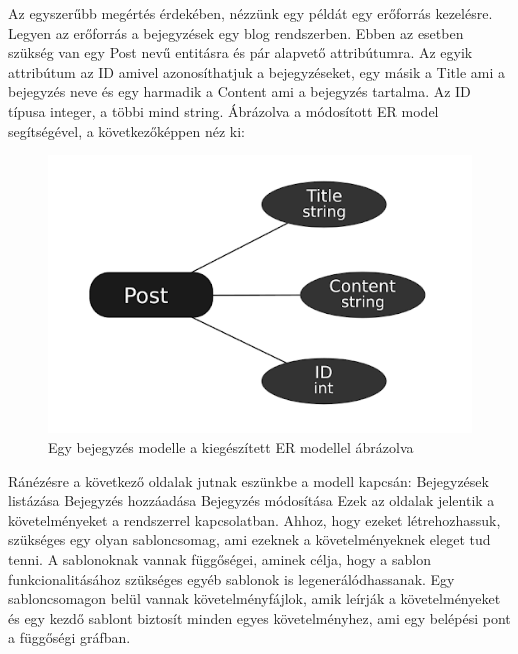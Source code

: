 \documentclass[a4paper,12pt,oneside]{report}
\begin{document}
\begin{justify}

	Az egyszerűbb megértés érdekében, nézzünk egy példát egy erőforrás kezelésre. Legyen az erőforrás a bejegyzések egy blog rendszerben. Ebben az esetben szükség van egy Post nevű entitásra és pár alapvető attribútumra. Az egyik attribútum az ID amivel azonosíthatjuk a bejegyzéseket, egy másik a Title ami a bejegyzés neve és egy harmadik a Content ami a bejegyzés tartalma. Az ID típusa integer, a többi mind string. Ábrázolva a módosított ER model segítségével, a következőképpen néz ki:

	\begin{figure}[h]
		\includegraphics[width=\textwidth]{contents/images/post_ermodel.png}
		\caption{Egy bejegyzés modelle a kiegészített ER modellel ábrázolva}
		\label{fig:post_ermodel}
	\end{figure}

	Ránézésre a következő oldalak jutnak eszünkbe a modell kapcsán:
	Bejegyzések listázása
	Bejegyzés hozzáadása
	Bejegyzés módosítása
	Ezek az oldalak jelentik a követelményeket a rendszerrel kapcsolatban. Ahhoz, hogy ezeket létrehozhassuk, szükséges egy olyan sabloncsomag, ami ezeknek a követelményeknek eleget tud tenni. A sablonoknak vannak függőségei, aminek célja, hogy a sablon funkcionalitásához szükséges egyéb sablonok is legenerálódhassanak.  Egy sabloncsomagon belül vannak követelményfájlok, amik leírják a követelményeket és egy kezdő sablont biztosít minden egyes követelményhez, ami egy belépési pont a függőségi gráfban.


\end{justify}
\end{document}
